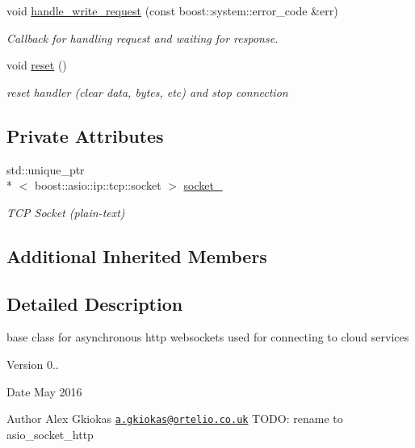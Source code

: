 \begin{DoxyCompactItemize}
void \hyperlink{classrapp_1_1cloud_1_1asio__service__http_ae408c936e746f56a5ff0890e126e32fd}{handle\-\_\-write\-\_\-request} (const boost\-::system\-::error\-\_\-code \&err)
\begin{DoxyCompactList}\small\item\em Callback for handling request and waiting for response. \end{DoxyCompactList}\item 
void \hyperlink{classrapp_1_1cloud_1_1asio__service__http_a562b730d1b9ebf9473b97d441459218b}{reset} ()
\begin{DoxyCompactList}\small\item\em reset handler (clear data, bytes, etc) and stop connection \end{DoxyCompactList}\end{DoxyCompactItemize}
\subsection*{Private Attributes}
\begin{DoxyCompactItemize}
\item 
std\-::unique\-\_\-ptr\\*
$<$ boost\-::asio\-::ip\-::tcp\-::socket $>$ \hyperlink{classrapp_1_1cloud_1_1asio__service__http_a300bce910d976e3d7efa6be1ce183fb1}{socket\-\_\-}
\begin{DoxyCompactList}\small\item\em T\-C\-P Socket (plain-\/text) \end{DoxyCompactList}\end{DoxyCompactItemize}
\subsection*{Additional Inherited Members}


\subsection{Detailed Description}
base class for asynchronous http websockets used for connecting to cloud services 

\begin{DoxyVersion}{Version}
0.. 
\end{DoxyVersion}
\begin{DoxyDate}{Date}
May 2016 
\end{DoxyDate}
\begin{DoxyAuthor}{Author}
Alex Gkiokas \href{mailto:a.gkiokas@ortelio.co.uk}{\tt a.\-gkiokas@ortelio.\-co.\-uk} T\-O\-D\-O\-: rename to {\ttfamily asio\-\_\-socket\-\_\-http} 
\end{DoxyAuthor}


